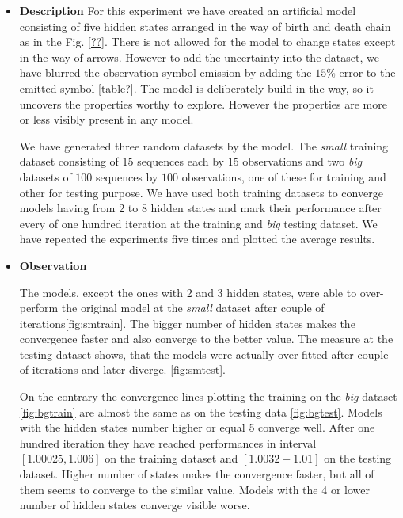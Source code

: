 \documentclass[thesis=M,english]{FITthesis}[2012/10/20]
\begin{document}
\begin{itemize}
\item \textbf{ Description }
For this experiment we have created an artificial model consisting of five hidden states arranged in the way of birth and death chain as in the Fig. \ref{??}. There is not allowed for the model to change states except in the way of arrows. However to add the uncertainty into the dataset, we have blurred the observation symbol emission by adding the $15\%$ error to the emitted symbol [table?]. The model is deliberately build in the way, so it uncovers the properties worthy to explore. However the properties are more or less visibly present in any model.  

We have generated three random datasets by the model. The \textit{small} training dataset consisting of $15$ sequences each by $15$ observations and two \textit{big} datasets of $100$ sequences by $100$ observations, one of these for training and other for testing purpose. We have used both training datasets to converge models having from 2 to 8 hidden states and mark their performance after every of one hundred iteration at the training and \textit{big} testing dataset. We have repeated the experiments five times and plotted the average results.   

\item \textbf{ Observation }

The models, except the ones with 2 and 3 hidden states, were able to over-perform the original model at the \textit{small} dataset after couple of iterations\ref{fig:smtrain}. The bigger number of hidden states makes the convergence faster and also converge to the better value. The measure at the testing dataset shows, that the models were actually over-fitted after couple of iterations and later diverge. \ref{fig:smtest}. 

On the contrary the convergence lines plotting the training on the \textit{big} dataset \ref{fig:bgtrain} are almost the same as on the testing data \ref{fig:bgtest}. Models with the hidden states number higher or equal 5 converge well. After one hundred iteration they have reached performances in interval $[1.00025,1.006]$ on the training dataset and $[1.0032-1.01]$ on the testing dataset. Higher number of states makes the convergence faster, but all of them seems to converge to the similar value. Models with the 4 or lower number of hidden states converge visible worse. 


\end{itemize}
\end{document}

